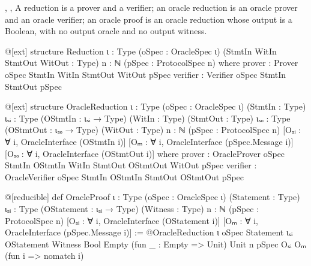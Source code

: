 

\begin{define}{, , }
A reduction is a prover and a verifier; an oracle reduction is an oracle prover and an oracle
verifier; an oracle proof is an oracle reduction whose output is a Boolean, with no output oracle
and no output witness.
\end{define}

\begin{leancode}
@[ext]
structure Reduction {ι : Type} (oSpec : OracleSpec ι)
    (StmtIn WitIn StmtOut WitOut : Type) {n : ℕ} (pSpec : ProtocolSpec n) where
  prover : Prover oSpec StmtIn WitIn StmtOut WitOut pSpec
  verifier : Verifier oSpec StmtIn StmtOut pSpec
\end{leancode}



\begin{leancode}
@[ext]
structure OracleReduction {ι : Type} (oSpec : OracleSpec ι)
    (StmtIn : Type) {ιₛᵢ : Type} (OStmtIn : ιₛᵢ → Type) (WitIn : Type)
    (StmtOut : Type) {ιₛₒ : Type} (OStmtOut : ιₛₒ → Type) (WitOut : Type)
    {n : ℕ} (pSpec : ProtocolSpec n)
    [Oₛᵢ : ∀ i, OracleInterface (OStmtIn i)] [Oₘ : ∀ i, OracleInterface (pSpec.Message i)]
    [Oₛₒ : ∀ i, OracleInterface (OStmtOut i)]
    where
  prover : OracleProver oSpec StmtIn OStmtIn WitIn StmtOut OStmtOut WitOut pSpec
  verifier : OracleVerifier oSpec StmtIn OStmtIn StmtOut OStmtOut pSpec
\end{leancode}



\begin{leancode}
@[reducible] def OracleProof {ι : Type} (oSpec : OracleSpec ι)
    (Statement : Type) {ιₛᵢ : Type} (OStatement : ιₛᵢ → Type) (Witness : Type)
    {n : ℕ} (pSpec : ProtocolSpec n)
    [Oₛᵢ : ∀ i, OracleInterface (OStatement i)]
    [Oₘ : ∀ i, OracleInterface (pSpec.Message i)] :=
  @OracleReduction ι oSpec Statement ιₛᵢ OStatement Witness Bool Empty
    (fun _ : Empty => Unit) Unit n pSpec Oₛᵢ Oₘ (fun i => nomatch i)
\end{leancode}

